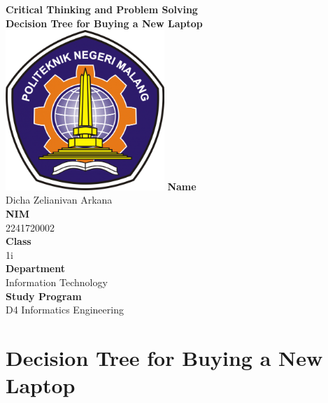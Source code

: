 \documentclass[12pt,titlepage]{article}
\newcommand{\vSubject}{Critical Thinking and Problem Solving}
\newcommand{\vSubtitle}{Decision Tree for Buying a New Laptop}
\newcommand{\vName}{Dicha Zelianivan Arkana}
\newcommand{\vNIM}{2241720002}
\newcommand{\vClass}{1i}
\newcommand{\vDepartment}{Information Technology}
\newcommand{\vStudyProgram}{D4 Informatics Engineering}
\begin{document}
\begin{titlepage}
    \centering
    \vfill
    {\bfseries\LARGE
        \vSubject\\
        \vskip0.25cm
        \vSubtitle
    }
    \vfill
    \includegraphics[width=6cm]{images/polinema-logo.png}
    \vfill
    {
        \textbf{Name}\\
        \vName\\
        \vskip0.5cm
        \textbf{NIM}\\
        \vNIM\\
        \vskip0.5cm
        \textbf{Class}\\
        \vClass\\
        \vskip0.5cm
        \textbf{Department}\\
        \vDepartment\\
        \vskip0.5cm
        \textbf{Study Program}\\
        \vStudyProgram
    }
\end{titlepage}

\section*{Decision Tree for Buying a New Laptop}
\end{document}
